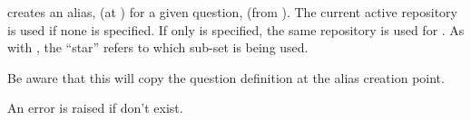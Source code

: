 \documentclass[10pt]{article}
\begin{document}
\begin{codedescribe}[code,update={2025-04-25}]{}
\begin{codesyntax}%
\end{codesyntax}
 creates an alias,  (at ) for a given question,  (from ). The current active repository is used if none is specified. If only  is specified, the same repository is used for . As with , the ``star'' refers to which sub-set is being used.
\end{codedescribe}


\begin{tsremark}
Be aware that this will copy the question definition at the alias creation point.
\end{tsremark}

\begin{tsremark}
An error is raised if  don't exist.
\end{tsremark}
\end{document}
